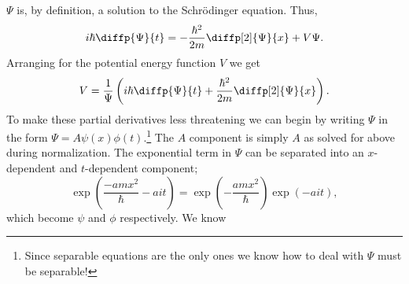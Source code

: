 \documentclass[a4paper, 12pt]{config/homework}
\begin{document}
\begin{enumerate}
\begin{enumerate}[label=(\alph*)]
\(\Psi\) is, by definition, a solution to the Schr{\"o}dinger equation. Thus,
\[i\hbar \diffp{\Psi}{t} = -\frac{\hbar^2}{2m} \diffp[2]{\Psi}{x} + V\Psi.\]
Arranging for the potential energy function \(V\) we get
\[V = \frac{1}{\Psi} \left(i\hbar \diffp{\Psi}{t} + \frac{\hbar^2}{2m} \diffp[2]{\Psi}{x}\right).\]
To make these partial derivatives less threatening we can begin by writing \(\Psi\) in the form \(\Psi = A \psi(x) \phi(t)\).\footnote{Since separable equations are the only ones we know how to deal with \(\Psi\) must be separable!} The \(A\) component is simply \(A\) as solved for above during normalization. The exponential term in \(\Psi\) can be separated into an \(x\)-dependent and \(t\)-dependent component;
\[\exp\left(\frac{-amx^2}{\hbar} - ait\right) = \exp\left(-\frac{amx^2}{\hbar}\right)\exp\left(-ait\right),\]
which become \(\psi\) and \(\phi\) respectively. We know

\end{enumerate}
\end{enumerate}
\end{document}
